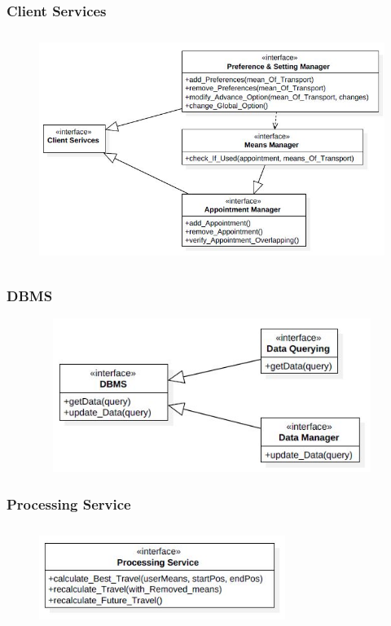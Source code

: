 \documentclass [12pt]{article}
\begin{document}
\subsubsection{Client Services}
\begin{figure}[ht!]
\centering
\includegraphics[height=7.5cm, width=14.5cm]{Int2.jpg}
\end{figure}
\subsubsection{DBMS}
\begin{figure}[ht!]
\centering
\includegraphics[height=5cm, width=12cm]{Int3.jpg}
\end{figure}
\clearpage
\subsubsection{Processing Service}
\begin{figure}[ht!]
\centering
\includegraphics[height=3.3cm, width=8cm]{Int4.jpg}
\end{figure}
\end{document}
